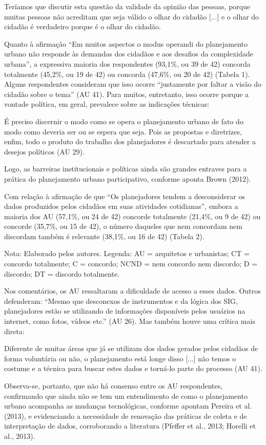 \documentclass{article}
\begin{document}
Teríamos que discutir esta questão da validade da opinião das pessoas, porque
muitas pessoas não acreditam que seja válido o olhar do cidadão
[...] e o olhar do cidadão é verdadeiro porque é o
olhar do cidadão.

Quanto à afirmação “Em muitos aspectos o modus operandi do planejamento
urbano não responde às demandas dos cidadãos e aos desafios da complexidade
urbana”, a expressiva maioria dos respondentes (93,1\%, ou 39 de 42)
concorda totalmente (45,2\%, ou 19 de 42) ou concorda (47,6\%, ou 20 de 42)
(Tabela 1). Alguns respondentes consideram
que isso ocorre “justamente por faltar a visão do cidadão sobre o
tema” (AU 41). Para muitos, entretanto, isso ocorre porque a
vontade política, em geral, prevalece sobre as indicações técnicas:

É preciso discernir o modo como se opera o planejamento urbano de fato do
modo como deveria ser ou se espera que seja. Pois as propostas e diretrizes,
enfim, todo o produto do trabalho dos planejadores é descartado para atender
a desejos políticos (AU 29).

Logo, as barreiras institucionais e políticas ainda são grandes entraves para a
prática do planejamento urbano participativo, conforme aponta Brown (2012).

Com relação à afirmação de que “Os planejadores tendem a desconsiderar os
dados produzidos pelos cidadãos em suas atividades cotidianas”,
embora a maioria dos AU (57,1\%, ou 24 de 42) concorde totalmente (21,4\%, ou 9
de
42) ou concorde (35,7\%, ou 15 de 42), o número daqueles que nem concordam nem
discordam também é relevante (38,1\%, ou 16 de 42) (Tabela 2).

Nota: Elaborado pelos autores. Legenda: AU = arquitetos e urbanistas;
CT = concordo totalmente; C = concordo; NCND = nem concordo nem
discordo; D = discordo; DT = discordo totalmente.

Nos comentários, os AU ressaltaram a dificuldade de acesso a esses dados. Outros
defenderam: “Mesmo que desconexos de instrumentos e da lógica dos SIG,
planejadores estão se utilizando de informações disponíveis pelos usuários
na internet, como fotos, vídeos etc.” (AU 26). Mas também houve uma
crítica mais direta:

Diferente de muitas áreas que já se utilizam dos dados gerados pelos cidadãos
de forma voluntária ou não, o planejamento está longe disso
[...] não temos o costume e a técnica para buscar estes
dados e torná-lo parte do processo (AU 41).

Observa-se, portanto, que não há consenso entre os AU respondentes, confirmando
que ainda não se tem um entendimento de como o planejamento urbano acompanha as
mudanças tecnológicas, conforme apontam Pereira
et al. (2013), e evidenciando a necessidade de renovação das práticas
de coleta e de interpretação de dados, corroborando a literatura (Pfeffer et
al., 2013; Horelli et al., 2013).
\end{document}
